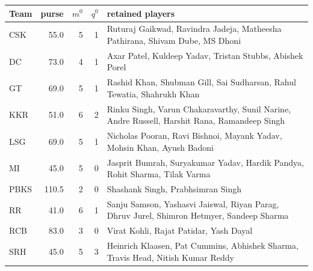 \begin{tabularx}{\linewidth}{@{}lrrrX@{}}\toprule
Team & purse & $m^0$ & $q^0$ & retained players\\\midrule
CSK & 55.0 & 5 & 1 & \footnotesize Ruturaj Gaikwad, Ravindra Jadeja, Matheesha Pathirana, Shivam Dube, MS Dhoni\\
DC & 73.0 & 4 & 1 & \footnotesize Axar Patel, Kuldeep Yadav, Tristan Stubbs, Abishek Porel\\
GT & 69.0 & 5 & 1 & \footnotesize Rashid Khan, Shubman Gill, Sai Sudharsan, Rahul Tewatia, Shahrukh Khan\\
KKR & 51.0 & 6 & 2 & \footnotesize Rinku Singh, Varun Chakaravarthy, Sunil Narine, Andre Russell, Harshit Rana, Ramandeep Singh\\
LSG & 69.0 & 5 & 1 & \footnotesize Nicholas Pooran, Ravi Bishnoi, Mayank Yadav, Mohsin Khan, Ayush Badoni\\
MI & 45.0 & 5 & 0 & \footnotesize Jasprit Bumrah, Suryakumar Yadav, Hardik Pandya, Rohit Sharma, Tilak Varma\\
PBKS & 110.5 & 2 & 0 & \footnotesize Shashank Singh, Prabhsimran Singh\\
RR & 41.0 & 6 & 1 & \footnotesize Sanju Samson, Yashasvi Jaiswal, Riyan Parag, Dhruv Jurel, Shimron Hetmyer, Sandeep Sharma\\
RCB & 83.0 & 3 & 0 & \footnotesize Virat Kohli, Rajat Patidar, Yash Dayal\\
SRH & 45.0 & 5 & 3 & \footnotesize Heinrich Klaasen, Pat Cummins, Abhishek Sharma, Travis Head, Nitish Kumar Reddy\\
\bottomrule\end{tabularx}
